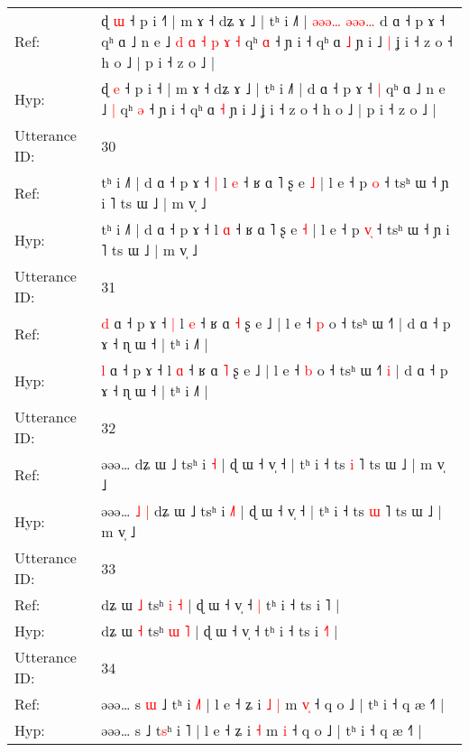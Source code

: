 \documentclass[10pt]{article}
\DeclareRobustCommand{\hl}[1]{{\textcolor{red}{#1}}}
\begin{document}
\begin{longtable}{ll}
Ref: & ɖ \hl{ɯ} ˧ p i ˧\hl{˥} | m ɤ ˧ dʑ ɤ ˩ | tʰ i ˩˥ |\hl{ }\hl{ə}\hl{ə}\hl{ə}\hl{…}\hl{ }\hl{ə}\hl{ə}\hl{ə}\hl{…} d ɑ ˧ p ɤ ˧\hl{}\hl{} qʰ ɑ ˩ n e ˩\hl{ }\hl{d}\hl{ }\hl{ɑ}\hl{ }\hl{˧}\hl{ }\hl{p}\hl{ }\hl{ɤ} \hl{˧} qʰ \hl{ɑ} ˧ ɲ i ˧ qʰ ɑ \hl{˩} ɲ i ˩\hl{ }\hl{|} ʝ i ˧ z o ˧ h o ˩ | p i ˧ z o ˩ |
 \\
Hyp: & ɖ \hl{e} ˧ p i ˧\hl{} | m ɤ ˧ dʑ ɤ ˩ | tʰ i ˩˥ |\hl{}\hl{}\hl{}\hl{}\hl{}\hl{}\hl{}\hl{}\hl{}\hl{} d ɑ ˧ p ɤ ˧\hl{ }\hl{|} qʰ ɑ ˩ n e ˩\hl{}\hl{}\hl{}\hl{}\hl{}\hl{}\hl{}\hl{}\hl{}\hl{} \hl{|} qʰ \hl{ə} ˧ ɲ i ˧ qʰ ɑ \hl{˧} ɲ i ˩\hl{}\hl{} ʝ i ˧ z o ˧ h o ˩ | p i ˧ z o ˩ |
 \\
\midrule
Utterance ID: & 30 \\
Ref: & tʰ i ˩˥ | d ɑ ˧ p ɤ ˧\hl{ }\hl{|} l \hl{e} ˧ ʁ ɑ ˥ ʂ e \hl{˩} | l e ˧ p \hl{}\hl{o} ˧ tsʰ ɯ ˧ ɲ i ˥ ts ɯ ˩ | m v̩ ˩
 \\
Hyp: & tʰ i ˩˥ | d ɑ ˧ p ɤ ˧\hl{}\hl{} l \hl{ɑ} ˧ ʁ ɑ ˥ ʂ e \hl{˧} | l e ˧ p \hl{v}\hl{̩} ˧ tsʰ ɯ ˧ ɲ i ˥ ts ɯ ˩ | m v̩ ˩
 \\
\midrule
Utterance ID: & 31 \\
Ref: & \hl{d} ɑ ˧ p ɤ ˧\hl{ }\hl{|} l \hl{e} ˧ ʁ ɑ \hl{˧} ʂ e ˩ | l e ˧ \hl{p} o ˧ tsʰ ɯ ˧˥\hl{}\hl{} | d ɑ ˧ p ɤ ˧ ɳ ɯ ˧ | tʰ i ˩˥ |
 \\
Hyp: & \hl{l} ɑ ˧ p ɤ ˧\hl{}\hl{} l \hl{ɑ} ˧ ʁ ɑ \hl{˥} ʂ e ˩ | l e ˧ \hl{b} o ˧ tsʰ ɯ ˧˥\hl{ }\hl{i} | d ɑ ˧ p ɤ ˧ ɳ ɯ ˧ | tʰ i ˩˥ |
 \\
\midrule
Utterance ID: & 32 \\
Ref: & əəə…\hl{}\hl{}\hl{}\hl{} dʑ ɯ ˩ tsʰ i \hl{}\hl{˧} | ɖ ɯ ˧ v̩ ˧ | tʰ i ˧ ts \hl{i} ˥ ts ɯ ˩ | m v̩ ˩
 \\
Hyp: & əəə…\hl{ }\hl{˩}\hl{ }\hl{|} dʑ ɯ ˩ tsʰ i \hl{˩}\hl{˥} | ɖ ɯ ˧ v̩ ˧ | tʰ i ˧ ts \hl{ɯ} ˥ ts ɯ ˩ | m v̩ ˩
 \\
\midrule
Utterance ID: & 33 \\
Ref: & dʑ ɯ \hl{˩} tsʰ \hl{i} \hl{˧} | ɖ ɯ ˧ v̩ ˧\hl{ }\hl{|} tʰ i ˧ ts i \hl{}˥ |
 \\
Hyp: & dʑ ɯ \hl{˧} tsʰ \hl{ɯ} \hl{˥} | ɖ ɯ ˧ v̩ ˧\hl{}\hl{} tʰ i ˧ ts i \hl{˧}˥ |
 \\
\midrule
Utterance ID: & 34 \\
Ref: & əəə… s\hl{ }\hl{ɯ} ˩ t\hl{}ʰ i \hl{˩}˥ | l e ˧ ʑ i\hl{ }\hl{˩} \hl{|} m \hl{v}\hl{̩} ˧ q o ˩ | tʰ i ˧ q æ ˧˥ |
 \\
Hyp: & əəə… s\hl{}\hl{} ˩ t\hl{s}ʰ i \hl{}˥ | l e ˧ ʑ i\hl{}\hl{} \hl{˧} m \hl{}\hl{i} ˧ q o ˩ | tʰ i ˧ q æ ˧˥ |
 \\
\midrule

\end{longtable}
\end{document}
